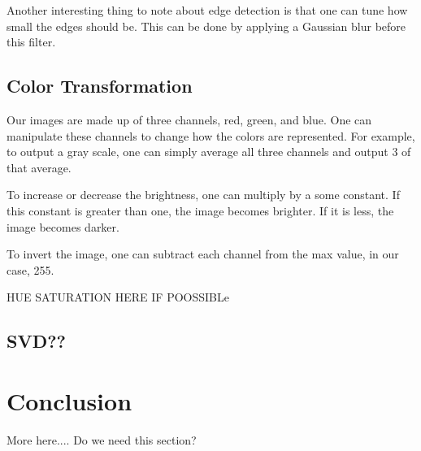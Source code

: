 \documentclass[11pt]{article}
\begin{document}
Another interesting thing to note about edge detection is that one can tune how small the edges should be. This can be done by applying a Gaussian blur before this filter.

\subsection{Color Transformation}
Our images are made up of three channels, red, green, and blue. One can manipulate these channels to change how the colors are represented. For example, to output a gray scale, one can simply average all three channels and output 3 of that average.

To increase or decrease the brightness, one can multiply by a some constant. If this constant is greater than one, the image becomes brighter. If it is less, the image becomes darker. 

To invert the image, one can subtract each channel from the max value, in our case, 255.


HUE SATURATION HERE IF POOSSIBLe


\subsection{SVD??}


\section{Conclusion}
More here.... Do we need this section?
\end{document}
